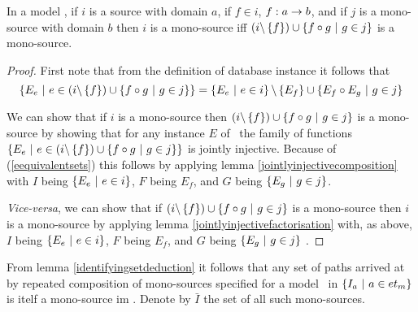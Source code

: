 \begin{lemma}
\label{identifyingsetdeduction}

In a model \genericmodel, if $i$ is a source with domain $a$,
if $f \in i$, $f: a \rightarrow b$, and if $j$ is a mono-source with domain $b$ then 
$i$ is a mono-source iff $(i \backslash \left\{f\right\}) \cup \left\{f \circ g \ \middle|\ g \in j\right\}$ is a mono-source.
\end{lemma}
\begin{proof}
First note that from the definition of database instance it follows that 
\begin{equation}
\label{eequivalentsets}
\left\{E_e \ \middle|\ e \in (i \backslash \left\{f\right\}) \cup \left\{f \circ g \ \middle|\ g \in j\right\}\right\}
= \left\{E_e \ \middle|\ e \in i\right\} \backslash \left\{E_f\right\} \cup \left\{E_f \circ E_g \ \middle|\ g \in j\right\}
\end{equation}

We can show that if $i$ is a mono-source 
then $(i \backslash \left\{f\right\}) \cup \left\{f \circ g \ \middle|\ g \in j\right\}$ is a mono-source
by showing that for any instance $E$ of \genericmodel\ the family of functions 
$\left\{E_e \ \middle|\ e \in (i \backslash \left\{f\right\}) \cup \left\{f \circ g \ \middle|\ g \in j\right\}\right\}$
is jointly injective. Because of (\ref{eequivalentsets}) this follows by applying lemma \ref{jointlyinjectivecomposition} with $I$ being $\left\{E_e \ \middle|\ e \in i\right\}$,
$F$ being $E_f$,  and $G$ being $\left\{E_g \ \middle|\ g \in j\right\}$.

\textit{Vice-versa}, we can show that if $(i \backslash \left\{f\right\}) \cup \left\{f \circ g \ \middle|\ g \in j\right\}$ is a mono-source then $i$ is a mono-source by applying lemma \ref{jointlyinjectivefactorisation} 
with, as above, $I$ being $\left\{E_e \ \middle|\ e \in i\right\}$,
$F$ being $E_f$,  and $G$ being $\left\{E_g \ \middle|\ g \in j\right\}$ .
\end{proof}

From lemma \ref{identifyingsetdeduction} it follows that any set of paths arrived at by repeated composition 
of mono-sources specified for a model \genericmodel\ in $\left\{I_a \ \middle|\ a \in et_{{m}}\right\}$ is itelf  
a mono-source im \genericmodel. Denote by $\bar{I}$ the set  of all such mono-sources.


